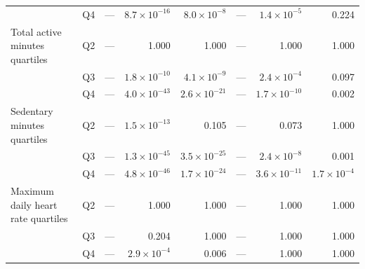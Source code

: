 \documentclass[11pt]{article}
\begin{document}
\begin{longtable}{@{}p{4.0cm}p{2.6cm}rrrrrr@{}}
 & Q4 & --- & $8.7\times10^{-16}$ & $8.0\times10^{-8}$ & --- & $1.4\times10^{-5}$ & 0.224 \\
Total active minutes quartiles & Q2 & --- & 1.000 & 1.000 & --- & 1.000 & 1.000 \\
 & Q3 & --- & $1.8\times10^{-10}$ & $4.1\times10^{-9}$ & --- & $2.4\times10^{-4}$ & 0.097 \\
 & Q4 & --- & $4.0\times10^{-43}$ & $2.6\times10^{-21}$ & --- & $1.7\times10^{-10}$ & 0.002 \\
Sedentary minutes quartiles & Q2 & --- & $1.5\times10^{-13}$ & 0.105 & --- & 0.073 & 1.000 \\
 & Q3 & --- & $1.3\times10^{-45}$ & $3.5\times10^{-25}$ & --- & $2.4\times10^{-8}$ & 0.001 \\
 & Q4 & --- & $4.8\times10^{-46}$ & $1.7\times10^{-24}$ & --- & $3.6\times10^{-11}$ & $1.7\times10^{-4}$ \\
Maximum daily heart rate quartiles & Q2 & --- & 1.000 & 1.000 & --- & 1.000 & 1.000 \\
 & Q3 & --- & 0.204 & 1.000 & --- & 1.000 & 1.000 \\
 & Q4 & --- & $2.9\times10^{-4}$ & 0.006 & --- & 1.000 & 1.000 \\
\bottomrule \end{longtable}\normalsize
\end{document}
